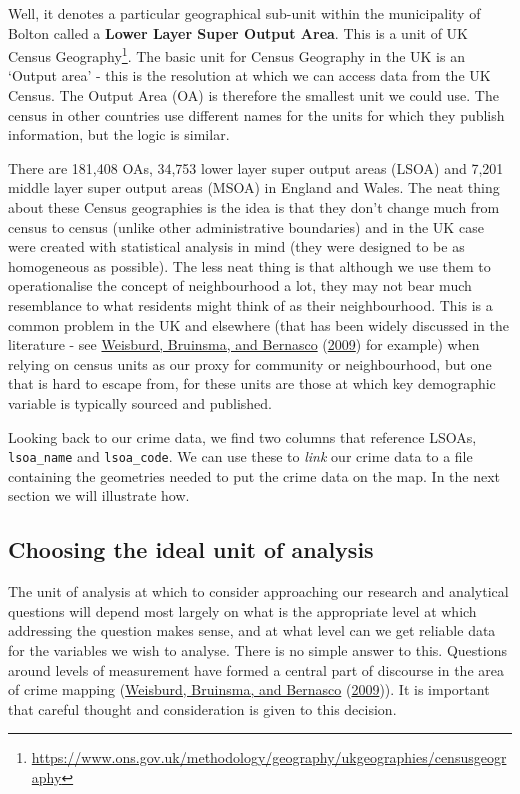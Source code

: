 \documentclass[
  krantz2]{krantz}
\renewcommand{\href}[2]{#2\footnote{\url{#1}}}
\begin{document}
Well, it denotes a particular geographical sub-unit within the municipality of Bolton called a \textbf{Lower Layer Super Output Area}. This is a unit of \href{https://www.ons.gov.uk/methodology/geography/ukgeographies/censusgeography}{UK Census Geography}. The basic unit for Census Geography in the UK is an `Output area' - this is the resolution at which we can access data from the UK Census. The Output Area (OA) is therefore the smallest unit we could use. The census in other countries use different names for the units for which they publish information, but the logic is similar.

There are 181,408 OAs, 34,753 lower layer super output areas (LSOA) and 7,201 middle layer super output areas (MSOA) in England and Wales. The neat thing about these Census geographies is the idea is that they don't change much from census to census (unlike other administrative boundaries) and in the UK case were created with statistical analysis in mind (they were designed to be as homogeneous as possible). The less neat thing is that although we use them to operationalise the concept of neighbourhood a lot, they may not bear much resemblance to what residents might think of as their neighbourhood. This is a common problem in the UK and elsewhere (that has been widely discussed in the literature - see \protect\hyperlink{ref-Weisburd_2009}{Weisburd, Bruinsma, and Bernasco} (\protect\hyperlink{ref-Weisburd_2009}{2009}) for example) when relying on census units as our proxy for community or neighbourhood, but one that is hard to escape from, for these units are those at which key demographic variable is typically sourced and published.

Looking back to our crime data, we find two columns that reference LSOAs, \texttt{lsoa\_name} and \texttt{lsoa\_code}. We can use these to \emph{link} our crime data to a file containing the geometries needed to put the crime data on the map. In the next section we will illustrate how.

\hypertarget{choosing-the-ideal-unit-of-analysis}{%
\subsection{Choosing the ideal unit of analysis}\label{choosing-the-ideal-unit-of-analysis}}

The unit of analysis at which to consider approaching our research and analytical questions will depend most largely on what is the appropriate level at which addressing the question makes sense, and at what level can we get reliable data for the variables we wish to analyse. There is no simple answer to this. Questions around levels of measurement have formed a central part of discourse in the area of crime mapping (\protect\hyperlink{ref-Weisburd_2009}{Weisburd, Bruinsma, and Bernasco} (\protect\hyperlink{ref-Weisburd_2009}{2009})). It is important that careful thought and consideration is given to this decision.
\end{document}
